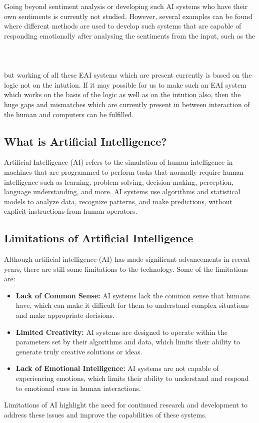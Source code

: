 Going beyond sentiment analysis or developing such AI systems who have their own sentiments is currently not studied. However, several examples can be found where different methods are used to develop such systems that are capable of responding emotionally after analysing the sentiments from the input, such as the \\\\\\\\
but working of all these EAI systems which are present currently is based on the logic not on the intution. If it may possible for us to make such an EAI system which works on the basis of the logic as well as on the intution also, then the huge gaps and mismatches which are currently present in between interaction of the human and computers can be fulfilled.

\subsection{What is Artificial Intelligence?}
Artificial Intelligence (AI) refers to the simulation of human intelligence in machines that are programmed to perform tasks that normally require human intelligence such as learning, problem-solving, decision-making, perception, language understanding, and more\cite{ISSN-2456-2165}. AI systems use algorithms and statistical models to analyze data, recognize patterns, and make predictions, without explicit instructions from human operators.

\subsection{Limitations of Artificial Intelligence}
Although artificial intelligence (AI) has made significant advancements in recent years, there are still some limitations to the technology. Some of the limitations are:
\begin{itemize}
	\item \textbf{Lack of Common Sense:} AI systems lack the common sense that humans have, which can make it difficult for them to understand complex situations and make appropriate decisions.
	\item \textbf{Limited Creativity:} AI systems are designed to operate within the parameters set by their algorithms and data, which limits their ability to generate truly creative solutions or ideas.
	\item \textbf{Lack of Emotional Intelligence:} AI systems are not capable of experiencing emotions, which limits their ability to understand and respond to emotional cues in human interactions.
\end{itemize}
Limitations of AI highlight the need for continued research and development to address these issues and improve the capabilities of these systems.

